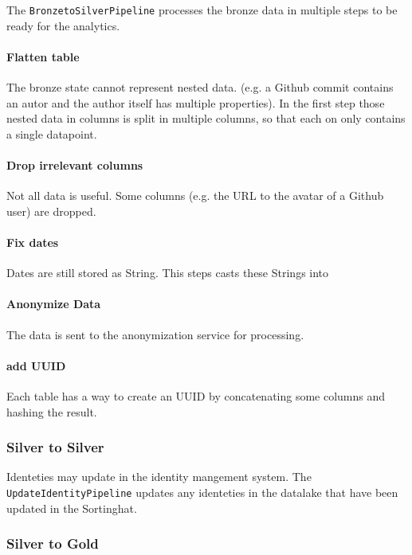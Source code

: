 The \texttt{BronzetoSilverPipeline} processes the bronze data in multiple steps to be ready for the analytics.

\paragraph{Flatten table} 

The bronze state cannot represent nested data. (e.g. a Github commit contains an autor and the author itself has multiple properties). In the first step those nested data in columns is split in multiple columns, so that each on only contains a single datapoint. 

\paragraph{Drop irrelevant columns}

Not all data is useful. Some columns (e.g. the URL to the avatar of a Github user) are dropped. 

\paragraph{Fix dates}

Dates are still stored as String. This steps casts these Strings into 

\paragraph{Anonymize Data}

The data is sent to the anonymization service for processing.

\paragraph{add UUID}

Each table has a way to create an \ac{UUID} by concatenating some columns and hashing the result.

\subsubsection{Silver to Silver}
\label{subsubsec:silver2silver}

Identeties may update in the identity mangement system. The \texttt{UpdateIdentityPipeline} updates any identeties in the datalake that have been updated in the Sortinghat.

\subsubsection{Silver to Gold}
\label{subsubsec:silver2gold}


